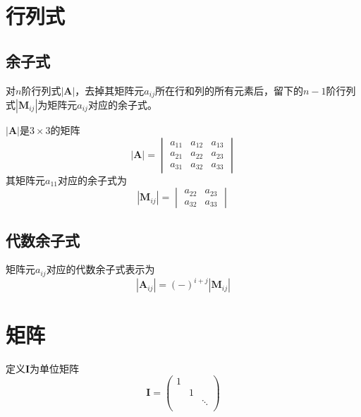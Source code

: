 \section{行列式}

\subsection{余子式}
对$n$阶行列式$|\bm{A}|$，去掉其矩阵元$a_{ij}$所在行和列的所有元素后，留下的$n-1$阶行列式$|\bm{M}_{ij}|$为矩阵元$a_{ij}$对应的余子式。

\begin{example}
    $|\bm{A}|$是$3\times 3$的矩阵
    \begin{equation*}
    |\bm{A}| = \begin{vmatrix}
        a_{11} & a_{12} & a_{13} \\
        a_{21} & a_{22} & a_{23} \\
        a_{31} & a_{32} & a_{33}
    \end{vmatrix}
    \end{equation*}
    其矩阵元$a_{11}$对应的余子式为
    \begin{equation*}
    |\bm{M}_{ij}| = \begin{vmatrix}
        a_{22} & a_{23} \\
        a_{32} & a_{33}
    \end{vmatrix}
    \end{equation*}
\end{example}

\subsection{代数余子式}
矩阵元$a_{ij}$对应的代数余子式表示为
\begin{equation}
    |\bm{A}_{ij}| = (-)^{i+j} |\bm{M}_{ij}|
\end{equation}

\section{矩阵}

定义$\bm{I}$为单位矩阵
\begin{equation}
    \bm{I} = \begin{pmatrix}
        1 &   &          \\
          & 1 &          \\
          &   &  \ddots  \\
    \end{pmatrix}
\end{equation}

